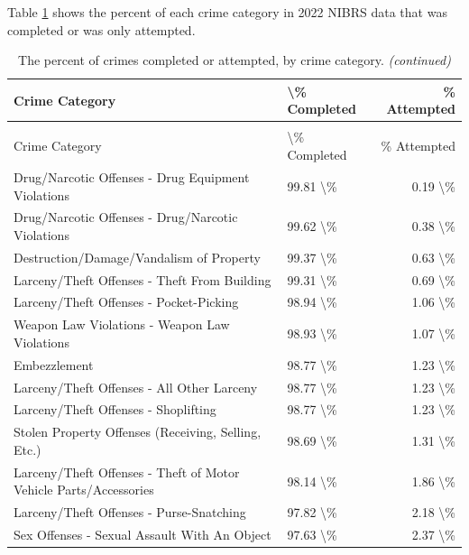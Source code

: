 \documentclass[
]{krantz}
\begin{document}
Table \ref{tab:offensesCompleted} shows the percent of each
crime category in 2022 NIBRS data that was completed or was
only attempted.

\begin{longtable}[t]{l|l|r}
\caption{\label{tab:offensesCompleted}The percent of crimes completed or attempted, by crime category.}\\
\hline
Crime Category & \textbackslash{}\% Completed & \% Attempted\\
\hline
\endfirsthead
\caption[]{\label{tab:offensesCompleted}The percent of crimes completed or attempted, by crime category. \textit{(continued)}}\\
\hline
Crime Category & \textbackslash{}\% Completed & \% Attempted\\
\hline
\endhead
Drug/Narcotic Offenses - Drug Equipment Violations & 99.81 \textbackslash{}\% & 0.19 \textbackslash{}\%\\
\hline
Drug/Narcotic Offenses - Drug/Narcotic Violations & 99.62 \textbackslash{}\% & 0.38 \textbackslash{}\%\\
\hline
Destruction/Damage/Vandalism of Property & 99.37 \textbackslash{}\% & 0.63 \textbackslash{}\%\\
\hline
Larceny/Theft Offenses - Theft From Building & 99.31 \textbackslash{}\% & 0.69 \textbackslash{}\%\\
\hline
Larceny/Theft Offenses - Pocket-Picking & 98.94 \textbackslash{}\% & 1.06 \textbackslash{}\%\\
\hline
Weapon Law Violations - Weapon Law Violations & 98.93 \textbackslash{}\% & 1.07 \textbackslash{}\%\\
\hline
Embezzlement & 98.77 \textbackslash{}\% & 1.23 \textbackslash{}\%\\
\hline
Larceny/Theft Offenses - All Other Larceny & 98.77 \textbackslash{}\% & 1.23 \textbackslash{}\%\\
\hline
Larceny/Theft Offenses - Shoplifting & 98.77 \textbackslash{}\% & 1.23 \textbackslash{}\%\\
\hline
Stolen Property Offenses (Receiving, Selling, Etc.) & 98.69 \textbackslash{}\% & 1.31 \textbackslash{}\%\\
\hline
Larceny/Theft Offenses - Theft of Motor Vehicle Parts/Accessories & 98.14 \textbackslash{}\% & 1.86 \textbackslash{}\%\\
\hline
Larceny/Theft Offenses - Purse-Snatching & 97.82 \textbackslash{}\% & 2.18 \textbackslash{}\%\\
\hline
Sex Offenses - Sexual Assault With An Object & 97.63 \textbackslash{}\% & 2.37 \textbackslash{}\%\\

\end{longtable}
\end{document}
